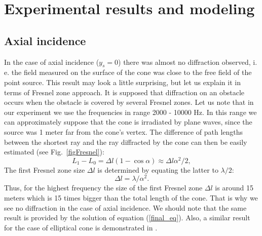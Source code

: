 \documentclass{procDDs}
\begin{document}
%
%
%


\section{Experimental results and modeling}

\subsection{Axial incidence}

In the case of axial incidence ($y_s = 0$) there was almost no diffraction observed, i. e. the field measured on the surface of the cone was close to the free field of the point source. This result may look a little surprising, but let us explain it in terms of Fresnel zone approach. It is supposed that diffraction on an obstacle occurs when the obstacle is covered by several Fresnel zones. Let us note that in our experiment we use the frequencies in range 2000 - 10000 Hz. In this range we can approximately suppose that the cone is irradiated by plane waves, since the source was 1 meter far from the cone's vertex. The difference of path lengths between the shortest ray and the ray diffracted by the cone can then be easily estimated (see Fig.~\ref{figFresnel}):
\begin{equation}
\label{Fresnel}
L_1 - L_0 = \Delta l(1 - \cos\alpha)\approx \Delta l \alpha^2/2,
\end{equation}
The first Fresnel zone size $\Delta l$ is determined by equating the latter to $\lambda/2$:     
\begin{equation}
\Delta l = \lambda/\alpha^2.
\end{equation}
Thus, for the highest frequency  the size of the first Fresnel zone $\Delta l$ is around 15 meters which is 15 times bigger than the total length of the cone. That is why we see no diffraction in the case of axial incidence. We should note that the same result is provided by the solution of equation (\ref{final_eq}). Also, a similar result for the case of elliptical cone is demonstrated in \cite{babich1995}.
\end{document}
